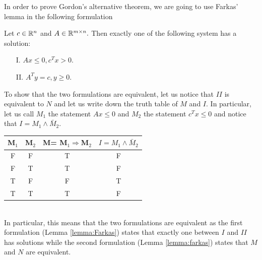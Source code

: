 \documentclass[10pt,a4paper]{article}
\begin{document}
\noindent In order to prove Gordon's alternative theorem, we are going to use Farkas' lemma in the following formulation
\begin{lemma}\label{lemma:Farkas}
	Let $c\in \mathbb{R}^n$ and $A\in \mathbb{R}^{m\times n}.$ Then exactly one of the following system has a solution:
	\begin{itemize}
		\item[I.] $Ax\leq 0, c^Tx> 0$. 
		\item[II.] $A^Ty=c, y\geq 0$.
	\end{itemize}
\end{lemma}
\noindent To show that the two formulations are equivalent, let us notice that $II$ is equivalent to $N$ and let us write down the truth table of $M$ and $I$. In particular, let us call $M_1$ the statement $Ax\leq 0$ and $M_2$ the statement $c^Tx\leq0$ and notice that $I=M_1 \wedge \bar{M}_2$.\\

\begin{tabular}{|c|c|c|c|}
	\hline
	M$_1$& M$_2$ & M= M$_1\Rightarrow$M$_2$& $I=M_1 \wedge \bar{M}_2$ \\
	\hline
	F& F & T & F \\
	\hline
	F& T & T & F \\
	\hline
	T& F & F & T \\
	\hline
	T& T & T & F \\
	\hline
\end{tabular}\\[1\baselineskip]
In particular, this means that the two formulations are equivalent as the first formulation (Lemma \ref{lemma:Farkas}) states that exactly one between $I$ and $II$ has solutions while the second formulation (Lemma \ref{lemma:farkas}) states that $M$ and $N$ are equivalent.



\end{document}

